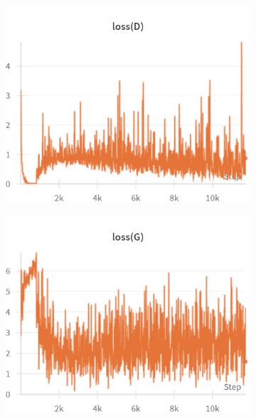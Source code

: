 \begin{figure}[H]
    \centering

    \begin{subfigure}{0.45\textwidth}
        \centering
        \includegraphics[width=0.95\linewidth]{cifar10/64_nz100/lossD.png}
        \caption{}
        \label{subfig:cifar10/64_nz100/lossD}
    \end{subfigure}%
    \begin{subfigure}{0.45\textwidth}
        \centering
        \includegraphics[width=0.95\linewidth]{cifar10/64_nz100/lossG.png}
        \caption{}
        \label{subfig:cifar10/64_nz100/lossG}
    \end{subfigure}


\end{figure}
